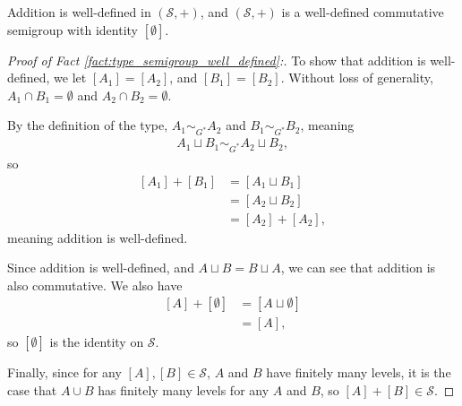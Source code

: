 \begin{fact}
  Addition is well-defined in $\left(\mathcal{S},+\right)$, and $\left(\mathcal{S},+\right)$ is a well-defined commutative semigroup with identity $\left[\emptyset\right]$.\label{fact:type_semigroup_well_defined}
\end{fact}
\begin{proof}[Proof of Fact \ref{fact:type_semigroup_well_defined}:]
  To show that addition is well-defined, we let $\left[A_1\right] = \left[A_2\right]$, and $\left[B_1\right] = \left[B_2\right]$. Without loss of generality, $A_1\cap B_1 = \emptyset$ and $A_2\cap B_2 = \emptyset$.\newline

  By the definition of the type, $A_1\sim_{G^{\ast}}A_2$ and $B_1\sim_{G^{\ast}}B_2$, meaning
  \begin{align*}
    A_1\sqcup B_1\sim_{G^{\ast}} A_2\sqcup B_2,
  \end{align*}
  so
  \begin{align*}
    \left[A_1\right] + \left[B_1\right] &= \left[A_1\sqcup B_1\right]\\
                                        &= \left[A_2\sqcup B_2\right]\\
                                        &= \left[A_2\right] + \left[A_2\right],
  \end{align*}
  meaning addition is well-defined.\newline

  Since addition is well-defined, and $A\sqcup B = B\sqcup A$, we can see that addition is also commutative. We also have
  \begin{align*}
    \left[A\right] + \left[\emptyset\right] &= \left[A\sqcup \emptyset\right]\\
                                            &= \left[A\right],
  \end{align*}
  so $\left[\emptyset\right]$ is the identity on $\mathcal{S}$.\newline

  Finally, since for any $\left[A\right],\left[B\right]\in \mathcal{S}$, $A$ and $B$ have finitely many levels, it is the case that $A\cup B$ has finitely many levels for any $A$ and $B$, so $\left[A\right] + \left[B\right] \in \mathcal{S}$. 
\end{proof}


